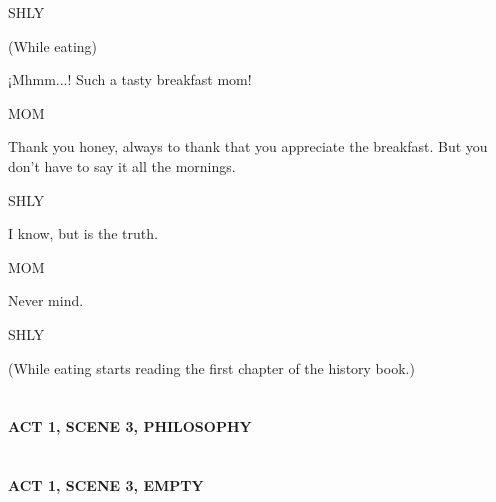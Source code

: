 SHLY\par
(While eating)\par
¡Mhmm...! Such a tasty breakfast mom!\par

\vspace{1cm}

MOM\par
Thank you honey, always to thank that you appreciate the breakfast. But you don't have to say it all the mornings.

\vspace{1cm}

SHLY\par
I know, but is the truth.

\vspace{1cm}

MOM\par
Never mind.

\vspace{1cm}

SHLY\par
(While eating starts reading the first chapter of the history book.)\par



\vspace{3cm}

\section*{}
\textbf{ACT 1, SCENE 3, PHILOSOPHY}\label{act1: Philosophy}\par

\vspace{3cm}

\section*{}
\textbf{ACT 1, SCENE 3, EMPTY}\label{act1: Empty}\par